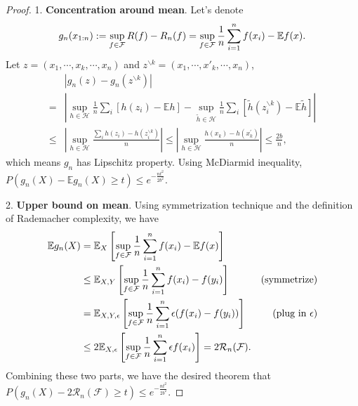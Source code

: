 \begin{proof}
1. \textbf{Concentration around mean}. Let's denote
$$g_n(x_{1:n}) :=   \sup_{f \in \mathcal{F}} R(f) - R_n(f)= \sup_{f \in \mathcal{F}} \frac{1}{n} \sum_{i=1}^n f(x_i) - \mathbb{E}{f(x)}.$$
Let $z = (x_1, \cdots, x_k, \cdots, x_n)$ and $z^{\backslash k} = (x_1, \cdots, x'_k, \cdots, x_n)$,
\begin{align*}
& \left|g_{n}(z)-g_{n}\left(z^{\backslash k}\right)\right| \\
= & \left|\sup _{h \in \mathcal{H}} \frac{1}{n} \sum_{i}\left[h\left(z_{i}\right)-\mathbb{E} h\right]-\sup _{\tilde{h} \in \mathcal{H}} \frac{1}{n} \sum_{i}\left[\tilde{h}\left(z_{i}^{\backslash k}\right)-\mathbb{E} \tilde{h}\right]\right| \\
\leq & \left|\sup _{h \in \mathcal{H}} \frac{\sum_{i} h\left(z_{i}\right)-h\left(z_{i}^{\backslash k}\right)}{n}\right| \leq\left|\sup _{h \in \mathcal{H}} \frac{h\left(x_{k}\right)-h\left(x_{k}^{\prime}\right)}{n}\right| \leq \frac{2 b}{n},
\end{align*}
which means $g_n$ has Lipschitz property.
Using McDiarmid inequality, $P\left(g_{n}(X) - \mathbb{E}g_{n}(X) \geq t\right) \leq e^{-\frac{n t^{2}}{2 b^{2}}}$.


2. \textbf{Upper bound on mean}. Using symmetrization technique and the definition of Rademacher complexity, we have
\begin{align*}
    \mathbb{E} g_n(X) & = \mathbb{E}_{X}\left[ \sup_{f \in \mathcal{F}} \frac{1}{n} \sum_{i=1}^n f(x_i) - \mathbb{E}{f(x)} \right] \\
    & \leq \mathbb{E}_{X, Y}\left[ \sup_{f \in \mathcal{F}} \frac{1}{n} \sum_{i=1}^n f(x_i) - f(y_i) \right] & (\text{symmetrize}) \\
    & = \mathbb{E}_{X, Y, \epsilon}\left[ \sup_{f \in \mathcal{F}} \frac{1}{n} \sum_{i=1}^n \epsilon (f(x_i) - f(y_i)) \right] & (\text{plug in } \epsilon) \\
    & \leq 2 \mathbb{E}_{X, \epsilon}\left[ \sup_{f \in \mathcal{F}} \frac{1}{n} \sum_{i=1}^n \epsilon f(x_i) \right] = 2 \mathcal{R}_n(\mathcal{F}).
\end{align*}
Combining these two parts, we have the desired theorem that $P\left(g_{n}(X) - 2\mathcal{R}_n(\mathcal{F}) \geq t\right) \leq e^{-\frac{n t^{2}}{2 b^{2}}}$.
\end{proof}

